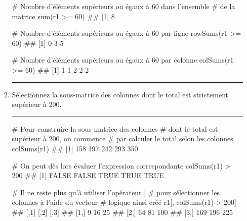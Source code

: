 \documentclass[12pt,twosided, notitlepage]{book}
\newenvironment{Shaded}{}{}
\newcommand{\KeywordTok}[1]{\textcolor[rgb]{0.00,0.00,1.00}{{#1}}}
\newcommand{\DecValTok}[1]{{#1}}
\newcommand{\StringTok}[1]{\textcolor[rgb]{0.00,0.50,0.50}{{#1}}}
\newcommand{\CommentTok}[1]{\textcolor[rgb]{0.00,0.50,0.00}{{#1}}}
\newcommand{\NormalTok}[1]{{#1}}
\newif \ifsol
\renewenvironment{Shaded}{\begin{snugshade}}{\end{snugshade}}
\begin{document}
\begin{enumerate}
\begin{enumerate}
\begin{Shaded}
\begin{Highlighting}[]
\CommentTok{# Nombre d'éléments supérieurs ou égaux à 60 dans l'ensemble}
\CommentTok{# de la matrice}
\KeywordTok{sum}\NormalTok{(r1 >=}\StringTok{ }\DecValTok{60}\NormalTok{)}
  \NormalTok{## [1] 8}

\CommentTok{# Nombre d'éléments supérieurs ou égaux à 60 par ligne}
\KeywordTok{rowSums}\NormalTok{(r1 >=}\StringTok{ }\DecValTok{60}\NormalTok{)}
  \NormalTok{## [1] 0 3 5}

\CommentTok{# Nombre d'éléments supérieurs ou égaux à 60 par colonne}
\KeywordTok{colSums}\NormalTok{(r1 >=}\StringTok{ }\DecValTok{60}\NormalTok{)}
  \NormalTok{## [1] 1 1 2 2 2}
\end{Highlighting}
\end{Shaded}

    \begin{center} \rule{0.5\linewidth}{\linethickness}\end{center}

    \bigskip  \fi 
  \item
    Sélectionnez la sous-matrice des colonnes dont le total est
    strictement supérieur à 200.

    \ifsol 

    \begin{center} \rule{0.5\linewidth}{\linethickness}\end{center}

\begin{Shaded}
\begin{Highlighting}[]
\CommentTok{# Pour construire la sous-matrice des colonnes}
\CommentTok{# dont le total est supérieur à 200, on commence}
\CommentTok{# par calculer le total selon les colonnes}
\KeywordTok{colSums}\NormalTok{(r1)}
  \NormalTok{## [1] 158 197 242 293 350}

\CommentTok{# On peut dès lors évaluer l'expression correspondante}
\KeywordTok{colSums}\NormalTok{(r1) >}\StringTok{ }\DecValTok{200}
  \NormalTok{## [1] FALSE FALSE  TRUE  TRUE  TRUE}

\CommentTok{# Il ne reste plus qu'à utiliser l'opérateur [}
\CommentTok{# pour sélectionner les colonnes à l'aide du vecteur}
\CommentTok{# logique ainsi créé}
\NormalTok{r1[, }\KeywordTok{colSums}\NormalTok{(r1) >}\StringTok{ }\DecValTok{200}\NormalTok{]}
  \NormalTok{##      [,1] [,2] [,3]}
  \NormalTok{## [1,]    9   16   25}
  \NormalTok{## [2,]   64   81  100}
  \NormalTok{## [3,]  169  196  225}
\end{Highlighting}
\end{Shaded}


\end{enumerate}
\end{enumerate}
\end{document}
